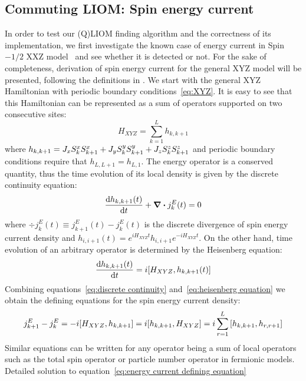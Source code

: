 \subsection{Commuting LIOM: Spin energy current\label{sec:energy current}}
In order to test our (Q)LIOM finding algorithm and the correctness of its implementation, we first
investigate the known case of energy current in Spin\(-1/2\) XXZ model~\autocite*{Mierzejewski2015Approx}
and see whether it is detected or not. For the sake of completeness, derivation of
spin energy current for the general XYZ model will be presented, following the definitions in \textcite{Zotos1997}.
We start with the general XYZ Hamiltonian with periodic boundary conditions~\eqref{eq:XYZ}.
It is easy to see that this Hamiltonian can be represented as a sum of operators supported on two consecutive sites:
\begin{equation}
  H_{XYZ} = \sum_{k=1}^L h_{k,k+1}
\end{equation}
where \(h_{k,k+1} = J_{x} S^{x}_{k}S^{x}_{k+1} + J_{y} S^{y}_{k}S^{y}_{k+1} + J_{z} S^{z}_{k}S^{z}_{k+1} \) and periodic boundary conditions
require that \(h_{L,L+1} = h_{L,1}\). The energy operator is a conserved quantity, thus the time evolution of its local density
is given by the discrete continuity equation:
\begin{equation}
  \dv{h_{k,k+1}(t)}{t} + \div{j_{k}^{E}(t)} = 0
  \label{eq:discrete continuity}
\end{equation}
where \(\div{j_{k}^E(t)} \equiv j_{k+1}^E(t) - j_{k}^E(t)\) is the discrete divergence of spin energy current density and \(h_{i,i+1}(t) = e^{i H_{XYZ}t} h_{i,i+1} e^{-i H_{XYZ} t}\).
On the other hand, time evolution of an arbitrary operator is determined
by the Heisenberg equation:
\begin{equation}
  \dv{h_{k,k+1}(t)}{t} = i \comm{H_{XYZ}}{h_{k,k+1}(t)}
  \label{eq:heisenberg equation}
\end{equation}
Combining equations~\eqref{eq:discrete continuity} and~\eqref{eq:heisenberg equation} we obtain the defining equations for
the spin energy current density:
\begin{equation}
  j_{k+1}^E - j_{k}^E = - i \comm{H_{XYZ}}{h_{k,k+1}} = i \comm{h_{k,k+1}}{H_{XYZ}} = i \sum_{r=1}^L \comm{h_{k,k+1}}{h_{r,r+1}}
  \label{eq:energy current defining equation}
\end{equation}
Similar equations can be written for any operator being a sum of local operators such as
the total spin operator or particle number operator in fermionic models. Detailed solution to equation~\eqref{eq:energy current defining equation}
